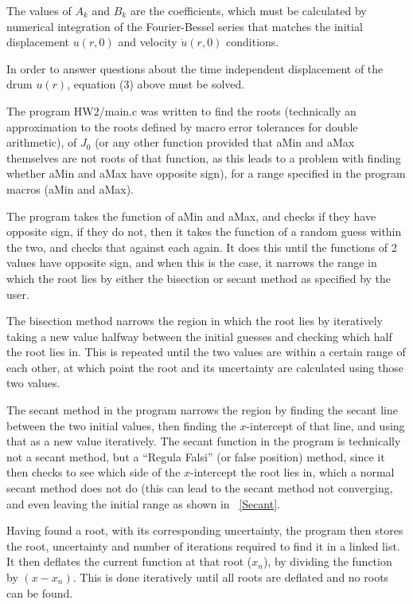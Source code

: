 \documentclass{article}
\newcommand{\figref}[2][\figurename~]{#1\ref{#2}}
\begin{document}
The values of $A_{k}$ and $B_{k}$ are the coefficients, which must be calculated by numerical integration of the Fourier-Bessel series that matches the initial displacement $u(r,0)$ and velocity $\dot{u}(r,0)$ conditions.



In order to answer questions about the time independent displacement of the drum $u(r)$, equation (3) above must be solved.

The program HW2/main.c was written to find the roots (technically an approximation to the roots defined by macro error tolerances for double arithmetic), of $J_0$ (or any other function provided that aMin and aMax themselves are not roots of that function, as this leads to a problem with finding whether aMin and aMax have opposite sign), for a range specified in the program macros (aMin and aMax). 

The program takes the function of aMin and aMax, and checks if they have opposite sign, if they do not, then it takes the function of a random guess within the two, and checks that against each again. It does this until the functions of 2 values have opposite sign, and when this is the case, it narrows the range in which the root lies by either the bisection or secant method as specified by the user.

The bisection method narrows the region in which the root lies by iteratively taking a new value halfway between the initial guesses and checking which half the root lies in. This is repeated until the two values are within a certain range of each other, at which point the root and its uncertainty are calculated using those two values.


The secant method in the program narrows the region by finding the secant line between the two initial values, then finding the $x$-intercept of that line, and using that as a new value iteratively. The secant function in the program is technically not a secant method, but a ``Regula Falsi'' (or false position) method, since it then checks to see which side of the $x$-intercept the root lies in, which a normal secant method does not do (this can lead to the secant method not converging, and even leaving the initial range as shown in \figref{Secant}.



Having found a root, with its corresponding uncertainty, the program then stores the root, uncertainty and number of iterations required to find it in a linked list. It then deflates the current function at that root ($x_n$), by dividing the function by $(x - x_n)$. This is done iteratively until all roots are deflated and no roots can be found. 
\end{document}

